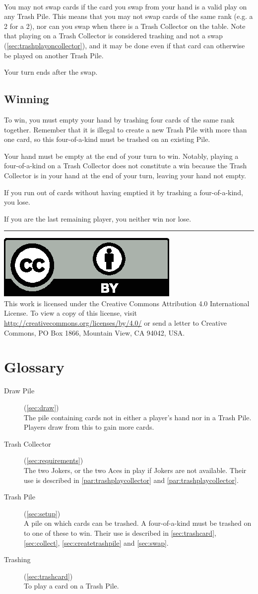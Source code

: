 \documentclass{article}
\newcommand\copyrightfooter{
  \medskip
  \hrule

  {
    \small
    \includegraphics[scale=0.5]{cc-by.eps}\\
    This work is licensed under the Creative Commons Attribution 4.0
    International License. To view a copy of this license, visit
    \url{http://creativecommons.org/licenses/by/4.0/} or send a letter to Creative Commons, PO Box 1866, Mountain View, CA 94042, USA.
  }
}
\begin{document}
\paragraph{} \label{par:swaprestriction}
You may not swap cards if the card you swap from your hand is a valid play on any Trash Pile. This means that you may not swap cards of the same rank (e.g. a 2 for a 2), nor can you swap when there is a Trash Collector on the table. Note that playing on a Trash Collector is considered trashing and not a swap (\autoref{sec:trashplayoncollector}), and it may be done even if that card can otherwise be played on another Trash Pile.

Your turn ends after the swap.

\subsection{Winning}
\label{sec:winning}

To win, you must empty your hand by trashing four cards of the same rank together. Remember that it is illegal to create a new Trash Pile with more than one card, so this four-of-a-kind must be trashed on an existing Pile.

Your hand must be empty at the end of your turn to win. Notably, playing a four-of-a-kind on a Trash Collector does not constitute a win because the Trash Collector is in your hand at the end of your turn, leaving your hand not empty.

If you run out of cards without having emptied it by trashing a four-of-a-kind, you lose.

If you are the last remaining player, you neither win nor lose.

\copyrightfooter

\newpage
\appendix
\section{Glossary}
\label{sec:glossary}

\begin{description}
  \item[Draw Pile] (\autoref{sec:draw})\\
    The pile containing cards not in either a player's hand nor in a Trash Pile. Players draw from this to gain more cards.
  \item[Trash Collector] (\autoref{sec:requirements})\\
    The two Jokers, or the two Aces in play if Jokers are not available. Their use is described in \autoref{par:trashplaycollector} and \autoref{par:trashplaycollector}.
  \item[Trash Pile] (\autoref{sec:setup})\\
    A pile on which cards can be trashed. A four-of-a-kind must be trashed on to one of these to win. Their use is described in \autoref{sec:trashcard}, \autoref{sec:collect}, \autoref{sec:createtrashpile} and \autoref{sec:swap}.
  \item[Trashing] (\autoref{sec:trashcard})\\
    To play a card on a Trash Pile.
\end{description}
\end{document}

